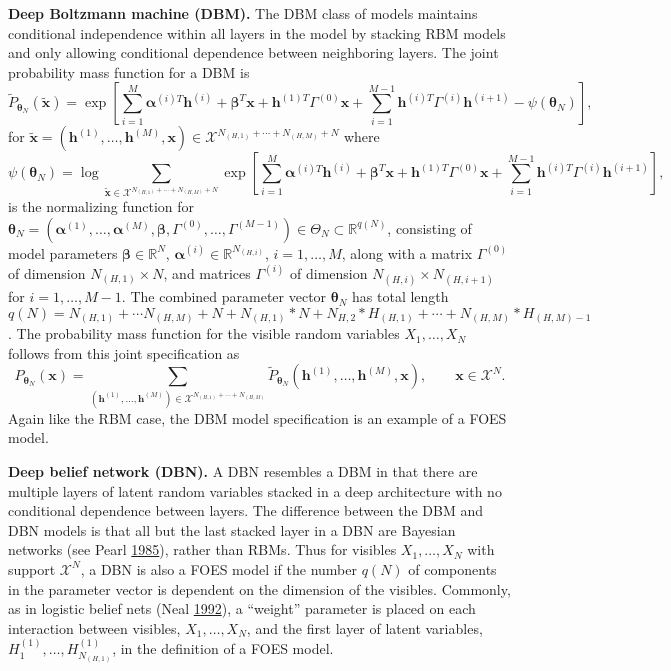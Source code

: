 \documentclass[]{article}
\theoremstyle{definition}
\begin{document}
\textbf{Deep Boltzmann machine (DBM).} The DBM class of models maintains
conditional independence within all layers in the model by stacking RBM
models and only allowing conditional dependence between neighboring
layers. The joint probability mass function for a DBM is \[
\tilde{P}_{\boldsymbol \theta_N} ( \tilde{\boldsymbol x} ) = \exp\left[ \sum\limits_{i = 1}^M\boldsymbol \alpha^{(i)T} \boldsymbol h^{(i)} + \boldsymbol \beta^T \boldsymbol x + \boldsymbol h^{(1)T} \Gamma^{(0)} \boldsymbol x + \sum\limits_{i = 1}^{M - 1} \boldsymbol h^{(i)T} \Gamma^{(i)} \boldsymbol h^{(i + 1)} - \psi(\boldsymbol \theta_N) \right],
\] for
\(\tilde{\boldsymbol x} = (\boldsymbol h^{(1)}, \dots, \boldsymbol h^{(M)}, \boldsymbol x) \in \mathcal{X}^{N_{(H,1)} + \cdots + N_{(H,M)} +N}\)
where \[
\psi(\boldsymbol \theta_N) = \log \sum\limits_{\tilde{\boldsymbol x} \in \mathcal{X}^{N_{(H,1)} + \cdots + N_{(H,M)} +N}} \exp\left[ \sum\limits_{i = 1}^M\boldsymbol \alpha^{(i)T} \boldsymbol h^{(i)} + \boldsymbol \beta^T \boldsymbol x + \boldsymbol h^{(1)T} \Gamma^{(0)} \boldsymbol x + \sum\limits_{i = 1}^{M - 1} \boldsymbol h^{(i)T} \Gamma^{(i)} \boldsymbol h^{(i + 1)}\right],
\] is the normalizing function for
\(\boldsymbol \theta_N = (\boldsymbol \alpha^{(1)}, \dots, \boldsymbol \alpha^{(M)}, \boldsymbol \beta,\Gamma^{(0)}, \dots, \Gamma^{(M - 1)}) \in \Theta_N \subset \mathbb{R}^{q(N)}\),
consisting of model parameters \(\boldsymbol \beta \in \mathbb{R}^N\),
\(\boldsymbol \alpha^{(i)} \in \mathbb{R}^{N_{(H,i)}}\),
\(i = 1, \dots, M\), along with a matrix \(\Gamma^{(0)}\) of dimension
\(N_{(H,1)} \times N\), and matrices \(\Gamma^{(i)}\) of dimension
\(N_{(H,i)} \times N_{(H,i+1)}\) for \(i = 1, \dots, M-1\). The combined
parameter vector \(\boldsymbol \theta_N\) has total length
\(q(N)= N_{(H,1)}+\cdots N_{(H,M)} + N + N_{(H,1)}*N+N_{H,2}*H_{(H,1)}+\cdots +N_{(H,M)}*H_{(H,M)-1}\).
The probability mass function for the visible random variables
\(X_1, \dots, X_N\) follows from this joint specification as \[
P_{\boldsymbol \theta_N} (\boldsymbol x) = \sum\limits_{(\boldsymbol h^{(1)}, \dots, \boldsymbol h^{(M)}) \in \mathcal{X}^{N_{(H,1)} + \cdots + N_{(H,M)}}} \tilde{P}_{\boldsymbol \theta_N} (\boldsymbol h^{(1)}, \dots, \boldsymbol h^{(M)}, \boldsymbol x) , \qquad \boldsymbol x \in \mathcal{X}^N.
\] Again like the RBM case, the DBM model specification is an example of
a FOES model.

\textbf{Deep belief network (DBN).} A DBN resembles a DBM in that there
are multiple layers of latent random variables stacked in a deep
architecture with no conditional dependence between layers. The
difference between the DBM and DBN models is that all but the last
stacked layer in a DBN are Bayesian networks (see Pearl
\protect\hyperlink{ref-pearl985bayesian}{1985}), rather than RBMs. Thus
for visibles \(X_1, \dots, X_N\) with support \(\mathcal{X}^N\), a DBN
is also a FOES model if the number \(q(N)\) of components in the
parameter vector is dependent on the dimension of the visibles.
Commonly, as in logistic belief nets (Neal
\protect\hyperlink{ref-neal1992connectionist}{1992}), a ``weight''
parameter is placed on each interaction between visibles,
\(X_1, \dots, X_N\), and the first layer of latent variables,
\(H^{(1)}_1, \dots, H^{(1)}_{N_{(H,1)}}\), in the definition of a FOES
model.
\end{document}
